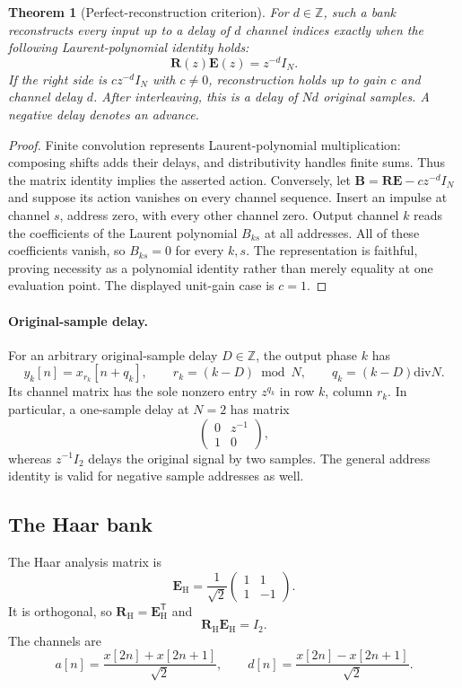 \documentclass[11pt]{article}
\newtheorem{theorem}{Theorem}[section]
\theoremstyle{definition}
\theoremstyle{remark}
\newcommand{\bbZ}{\mathbb Z}
\begin{document}
\begin{theorem}[Perfect-reconstruction criterion]\label{result:06}
For $d\in\bbZ$, such a bank reconstructs every input up to a delay of $d$ \emph{channel indices} exactly when the following Laurent-polynomial identity holds:
\[
\boxed{
\bm R(z)\bm E(z)=z^{-d}I_N.
}
\]
If the right side is $c z^{-d}I_N$ with $c\ne0$, reconstruction holds up to gain $c$ and channel delay $d$. After interleaving, this is a delay of $Nd$ original samples. A negative delay denotes an advance.
\end{theorem}

\begin{proof}
Finite convolution represents Laurent-polynomial multiplication: composing shifts adds their delays, and distributivity handles finite sums. Thus the matrix identity implies the asserted action. Conversely, let $\bm B=\bm R\bm E-cz^{-d}I_N$ and suppose its action vanishes on every channel sequence. Insert an impulse at channel $s$, address zero, with every other channel zero. Output channel $k$ reads the coefficients of the Laurent polynomial $B_{ks}$ at all addresses. All of these coefficients vanish, so $B_{ks}=0$ for every $k,s$. The representation is faithful, proving necessity as a polynomial identity rather than merely equality at one evaluation point. The displayed unit-gain case is $c=1$.
\end{proof}

\paragraph{Original-sample delay.}
For an arbitrary original-sample delay $D\in\bbZ$, the output phase $k$ has
\[
y_k[n]=x_{r_k}[n+q_k],\qquad
r_k=(k-D)\bmod N,\qquad q_k=(k-D)\mathbin{\mathrm{div}}N.
\]
Its channel matrix has the sole nonzero entry $z^{q_k}$ in row $k$, column $r_k$. In particular, a one-sample delay at $N=2$ has matrix
\[
\begin{pmatrix}0&z^{-1}\\1&0\end{pmatrix},
\]
whereas $z^{-1}I_2$ delays the original signal by two samples. The general address identity is valid for negative sample addresses as well.

\subsection{The Haar bank}

The Haar analysis matrix is
\[
\bm E_{\mathrm{H}}
=
\frac1{\sqrt2}
\begin{pmatrix}
1&1\\
1&-1
\end{pmatrix}.
\]
It is orthogonal, so $\bm R_{\mathrm{H}}=\bm E_{\mathrm{H}}^{\mathsf T}$ and
\[
\bm R_{\mathrm{H}}\bm E_{\mathrm{H}}=I_2.
\]
The channels are
\[
a[n]=\frac{x[2n]+x[2n+1]}{\sqrt2},
\qquad
d[n]=\frac{x[2n]-x[2n+1]}{\sqrt2}.
\]
\end{document}
